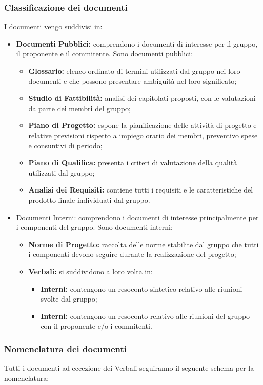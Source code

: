 \subsubsection{Classificazione dei documenti}
I documenti vengo suddivisi in:
\begin{itemize}
	\item \textbf{Documenti Pubblici: }comprendono i documenti di interesse per il gruppo, il proponente e il commitente. 
	Sono documenti pubblici:
	\begin{itemize}
		\item \textbf{Glossario: }elenco ordinato di termini utilizzati dal gruppo nei loro documenti e che possono presentare ambiguità nel loro significato;
		\item \textbf{Studio di Fattibilità: }analisi dei capitolati proposti, con le valutazioni da parte dei membri del gruppo;
		\item \textbf{Piano di Progetto: }espone la pianificazione delle attività di progetto e relative previsioni rispetto a impiego orario dei membri, preventivo spese e consuntivi di periodo;
		\item \textbf{Piano di Qualifica: }presenta i criteri di valutazione della qualità utilizzati dal gruppo;
		\item \textbf{Analisi dei Requisiti: }contiene tutti i requisiti e le caratteristiche del prodotto finale individuati dal gruppo.
	\end{itemize}
	\item Documenti Interni: comprendono i documenti di interesse principalmente per i componenti del gruppo.
	Sono documenti interni:
	\begin{itemize}
		\item \textbf{Norme di Progetto: } raccolta delle norme stabilite dal gruppo che tutti i componenti devono seguire durante la realizzazione del progetto;
		\item \textbf{Verbali: } si suddividono a loro volta in:
		\begin{itemize}
			\item \textbf{Interni: } contengono un resoconto sintetico relativo alle riunioni svolte dal gruppo;
			\item \textbf{Interni: } contengono un resoconto relativo alle riunioni del gruppo con il proponente e/o i commitenti.
		\end{itemize}
	\end{itemize}
\end{itemize}

\subsubsection{Nomenclatura dei documenti} \label{NomenclaturaDoc}
Tutti i documenti ad eccezione dei Verbali seguiranno il seguente schema per la nomenclatura:

